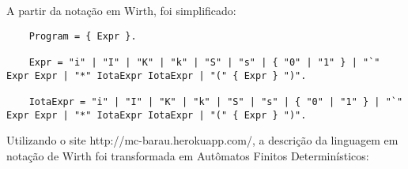 A partir da notação em Wirth, foi simplificado:

\begin{lstlisting}
    Program = { Expr }.

    Expr = "i" | "I" | "K" | "k" | "S" | "s" | { "0" | "1" } | "`" Expr Expr | "*" IotaExpr IotaExpr | "(" { Expr } ")".
    
    IotaExpr = "i" | "I" | "K" | "k" | "S" | "s" | { "0" | "1" } | "`" Expr Expr | "*" IotaExpr IotaExpr | "(" { Expr } ")".
\end{lstlisting}

Utilizando o site http://mc-barau.herokuapp.com/, a descrição da linguagem em notação de Wirth foi transformada em Autômatos Finitos Determinísticos:

